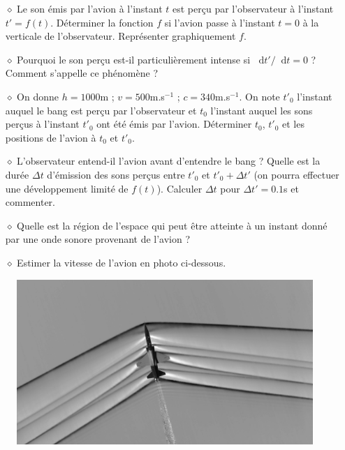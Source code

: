 \documentclass{report}
\newcommand*\dif{\mathop{}\!\mathrm{d}}
\begin{document}
\begin{itemize}

	\item[$\diamond$] Le son émis par l'avion à l'instant $t$ est perçu par l'observateur à l'instant $t'=f(t)$. Déterminer la fonction $f$ si l'avion passe à l'instant $t=0$ à la verticale de l'observateur. Représenter graphiquement $f$.
	
	\item[$\diamond$]  Pourquoi le son perçu est-il particulièrement intense si $\dif t'/\dif t=0$ ? Comment s'appelle ce phénomène ? 
	
	\item[$\diamond$]  On donne $h=1000$m ; $v=500$m.s$^{-1}$ ; $c=340$m.s$^{-1}$. On note $t'_0$ l'instant auquel le bang est perçu par l'observateur et $t_0$ l'instant auquel les sons perçus à l'instant $t'_0$ ont été émis par l'avion. Déterminer $t_0$, $t'_0$ et les positions de l'avion à $t_0$ et $t'_0$. 
	
	\item[$\diamond$] L'observateur entend-il l'avion avant d'entendre le bang ? Quelle est la durée $\Delta t$ d'émission des sons perçus entre $t'_0$ et $t'_0+\Delta t'$ (on pourra effectuer une développement limité de $f(t)$). Calculer $\Delta t$ pour $\Delta t'=0.1$s et commenter.
	
	\item[$\diamond$] Quelle est la région de l'espace qui peut être atteinte à un instant donné par une onde sonore provenant de l'avion ?
	
	\item[$\diamond$] Estimer la vitesse de l'avion en photo ci-dessous.  

\end{itemize}

\begin{figure}[h!]
\centering
		\includegraphics[scale=0.12]{avion.jpg}
\end{figure}
\end{document}
